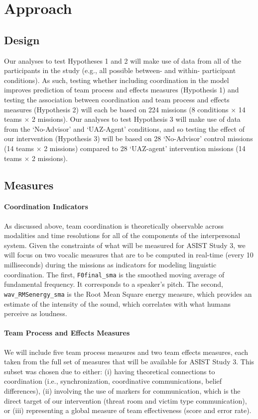 \section{Approach}

\subsection{Design}

Our analyses to test Hypotheses 1 and 2 will make use of data from all of the
participants in the study (e.g., all possible between- and within- participant
conditions). As such, testing whether including coordination in the model
improves prediction of team process and effects measures (Hypothesis 1) and
testing the association between coordination and team process and effects
measures (Hypothesis 2) will each be based on 224 missions (8 conditions
$\times$ 14 teams $\times$ 2 missions). Our analyses to test Hypothesis 3 will
make use of data from the `No-Advisor' and `UAZ-Agent' conditions, and so
testing the effect of our intervention (Hypothesis 3) will be based on 28
`No-Advisor' control missions (14 teams $\times$ 2 missions) compared to 28
`UAZ-agent' intervention missions (14 teams $\times$ 2 missions).

\subsection{Measures}
\label{subsec:measures}

\paragraph{Coordination Indicators} As discussed above, team coordination is
theoretically observable across modalities and time resolutions for all of the
components of the interpersonal system. Given the constraints of what will be
measured for ASIST Study 3, we will focus on two vocalic measures that are to
be computed in real-time (every 10 milliseconds) during the missions as
indicators for modeling linguistic coordination. The first,
\texttt{F0final\_sma} is the smoothed moving average of fundamental frequency.
It corresponds to a speaker’s pitch.  The second, \texttt{wav\_RMSenergy\_sma}
is the Root Mean Square energy measure, which provides an estimate of the
intensity of the sound, which correlates with what humans perceive as loudness. 

\paragraph{Team Process and Effects Measures} We will include five team process
measures and two team effects measures, each taken from the full set of
measures that will be available for ASIST Study 3. This subset was chosen due
to either: (i) having theoretical connections to coordination (i.e.,
synchronization, coordinative communications, belief differences), (ii)
involving the use of markers for communication, which is the direct target of
our intervention (threat room and victim type communication), or (iii)
representing a global measure of team effectiveness (score and error rate).

